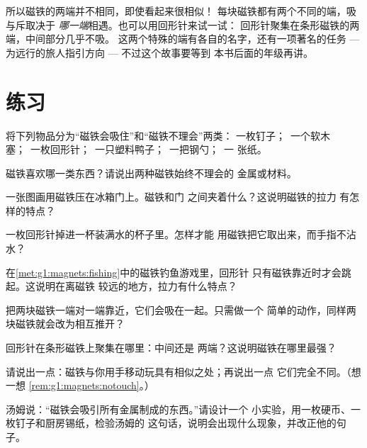 \begin{remark}[磁铁的两端]\label{rem:g1:magnets:ends}
所以磁铁的两端并不相同，即使看起来很相似！
每块磁铁都有两个不同的端，吸与斥取决于
\emph{哪一端}相遇。也可以用回形针来试一试：
回形针聚集在条形磁铁的两端，中间部分几乎不吸。
这两个特殊的端有各自的名字，还有一项著名的任务 ---
为远行的旅人指引方向 --- 不过这个故事要等到
本书后面的年级再讲。
\end{remark}

\section{练习}

\begin{exercise}[$\star$]\label{exo:g1:magnets:1}
将下列物品分为“磁铁会吸住”和“磁铁不理会”两类：
一枚钉子；\ 一个软木塞；\ 一枚回形针；\ 一只塑料鸭子；\ 一把钢勺；\ 一
张纸。
\end{exercise}

\begin{exercise}[$\star$]\label{exo:g1:magnets:2}
磁铁喜欢哪一类东西？请说出两种磁铁始终不理会的
金属或材料。
\end{exercise}

\begin{exercise}[$\star$]\label{exo:g1:magnets:3}
一张图画用磁铁压在冰箱门上。磁铁和门
之间夹着什么？这说明磁铁的拉力
有怎样的特点？
\end{exercise}

\begin{exercise}[$\star$]\label{exo:g1:magnets:4}
一枚回形针掉进一杯装满水的杯子里。怎样才能
用磁铁把它取出来，而手指不沾水？
\end{exercise}

\begin{exercise}[$\star$]\label{exo:g1:magnets:5}
在\cref{met:g1:magnets:fishing}中的磁铁钓鱼游戏里，回形针
只有磁铁靠近时才会跳起。这说明在离磁铁
较远的地方，拉力有什么特点？
\end{exercise}

\begin{exercise}[$\star$]\label{exo:g1:magnets:6}
把两块磁铁一端对一端靠近，它们会吸在一起。只需做一个
简单的动作，同样两块磁铁就会改为相互推开？
\end{exercise}

\begin{exercise}[$\star$]\label{exo:g1:magnets:7}
回形针在条形磁铁上聚集在哪里：中间还是
两端？这说明磁铁在哪里最强？
\end{exercise}

\begin{exercise}[$\star$]\label{exo:g1:magnets:8}
请说出一点：磁铁与你用手移动玩具有相似之处；再说出一点
它们完全不同。（想一想
\cref{rem:g1:magnets:notouch}。）
\end{exercise}

\begin{exercise}[$\star\star$]\label{exo:g1:magnets:9}
汤姆说：“磁铁会吸引所有金属制成的东西。”请设计一个
小实验，用一枚硬币、一枚钉子和厨房锡纸，检验汤姆的
这句话，说明会出现什么现象，并改正他的句子。
\end{exercise}
